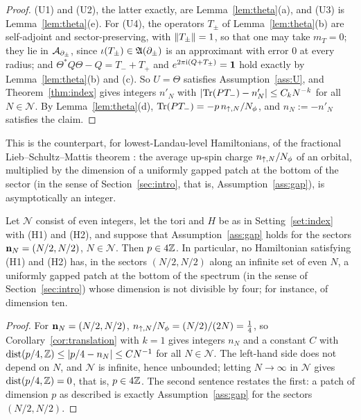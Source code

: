 \begin{proof}
(U1) and (U2), the latter exactly, are Lemma~\ref{lem:theta}(a), and (U3) is
Lemma~\ref{lem:theta}(e). For (U4), the operators $T_\pm$ of
Lemma~\ref{lem:theta}(b) are self-adjoint and sector-preserving, with $\lVert T_\pm\rVert=1$, so that one may take $m_T=0$; they
lie in $\mathcal{A}_{\partial_\pm}$, since $\iota(T_\pm)\in\mathfrak{A}(\partial_\pm)$ is an approximant with error $0$ at every radius; and
$\Theta^*Q\Theta-Q=T_-+T_+$ and $e^{2\pi\mathrm{i}(Q+T_\pm)}=\mathbf{1}$ hold exactly by Lemma~\ref{lem:theta}(b) and (c). So $U=\Theta$
satisfies Assumption~\ref{ass:U}, and Theorem~\ref{thm:index} gives integers $n'_N$ with
$\lvert\operatorname{Tr}(PT_-)-n'_N\rvert\le C_kN^{-k}$ for all $N\in\mathcal N$. By Lemma~\ref{lem:theta}(d), $\operatorname{Tr}(PT_-)=-p\,n_{{\uparrow},N}/N_{\phi}$, and
$n_N:=-n'_N$ satisfies the claim.
\end{proof}

This is the counterpart, for lowest-Landau-level Hamiltonians, of the fractional Lieb--Schultz--Mattis theorem
\cite[Corollary~5.2]{BBDF21}: the average up-spin charge $n_{{\uparrow},N}/N_{\phi}$ of an orbital, multiplied by the
dimension of a uniformly gapped patch at the bottom of the sector (in the sense of Section~\ref{sec:intro}, that is,
Assumption~\ref{ass:gap}), is asymptotically an integer.

\begin{corollary}\label{cor:classwide}
Let $\mathcal N$ consist of even integers, let the tori and $H$ be as in Setting~\ref{set:index} with (H1) and (H2),
and suppose that Assumption~\ref{ass:gap} holds for the sectors $\mathbf{n}_N=(N/2,N/2)$, $N\in\mathcal N$. Then $p\in4\mathbb{Z}$. In
particular, no Hamiltonian satisfying (H1) and (H2) has, in the sectors $(N/2,N/2)$ along an infinite set of
even $N$, a uniformly gapped patch at the bottom of the spectrum (in the sense of Section~\ref{sec:intro}) whose
dimension is not divisible by four; for instance, of dimension ten.
\end{corollary}

\begin{proof}
For $\mathbf{n}_N=(N/2,N/2)$, $n_{{\uparrow},N}/N_{\phi}=(N/2)/(2N)=\frac14$, so Corollary~\ref{cor:translation} with $k=1$ gives integers $n_N$
and a constant $C$ with $\operatorname{dist}(p/4,\mathbb{Z})\le\lvert p/4-n_N\rvert\le CN^{-1}$ for all $N\in\mathcal N$. The left-hand side does not depend on $N$, and
$\mathcal N$ is infinite, hence unbounded; letting $N\to\infty$ in $\mathcal N$ gives $\operatorname{dist}(p/4,\mathbb{Z})=0$, that is, $p\in4\mathbb{Z}$.
The second sentence restates the first: a patch of dimension $p$ as described is exactly Assumption~\ref{ass:gap} for the
sectors $(N/2,N/2)$.
\end{proof}

